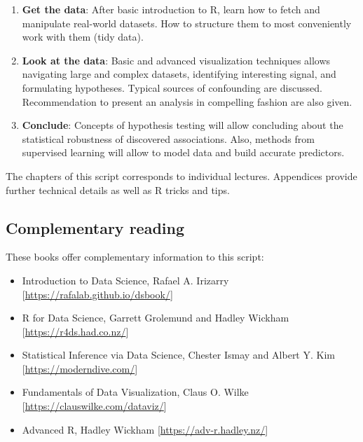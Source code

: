 \documentclass[
]{krantz}
\begin{document}
\begin{enumerate}
\def\labelenumi{\arabic{enumi}.}
\item
  \textbf{Get the data}: After basic introduction to R, learn how to fetch and manipulate real-world datasets. How to structure them to most conveniently work with them (tidy data).
\item
  \textbf{Look at the data}: Basic and advanced visualization techniques allows navigating large and complex datasets, identifying interesting signal, and formulating hypotheses. Typical sources of confounding are discussed. Recommendation to present an analysis in compelling fashion are also given.
\item
  \textbf{Conclude}: Concepts of hypothesis testing will allow concluding about the statistical robustness of discovered associations. Also, methods from supervised learning will allow to model data and build accurate predictors.
\end{enumerate}

The chapters of this script corresponds to individual lectures. Appendices provide further technical details as well as R tricks and tips.

\hypertarget{complementary-reading}{%
\subsection*{Complementary reading}\label{complementary-reading}}

These books offer complementary information to this script:

\begin{itemize}
\item
  Introduction to Data Science, Rafael A. Irizarry {[}\url{https://rafalab.github.io/dsbook/}{]}
\item
  R for Data Science, Garrett Grolemund and Hadley Wickham {[}\url{https://r4ds.had.co.nz/}{]}
\item
  Statistical Inference via Data Science, Chester Ismay and Albert Y. Kim {[}\url{https://moderndive.com/}{]}
\item
  Fundamentals of Data Visualization, Claus O. Wilke {[}\url{https://clauswilke.com/dataviz/}{]}
\item
  Advanced R, Hadley Wickham {[}\url{https://adv-r.hadley.nz/}{]}
\end{itemize}

  
\end{document}
